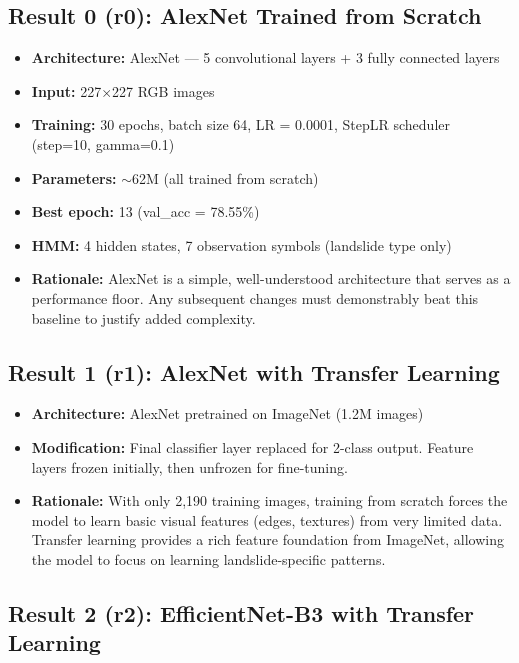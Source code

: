 \documentclass[11pt]{article}
\begin{document}
\subsection{Result 0 (r0): AlexNet Trained from Scratch}

\begin{itemize}[noitemsep]
    \item \textbf{Architecture:} AlexNet --- 5 convolutional layers + 3 fully connected layers
    \item \textbf{Input:} 227$\times$227 RGB images
    \item \textbf{Training:} 30 epochs, batch size 64, LR = 0.0001, StepLR scheduler (step=10, gamma=0.1)
    \item \textbf{Parameters:} $\sim$62M (all trained from scratch)
    \item \textbf{Best epoch:} 13 (val\_acc = 78.55\%)
    \item \textbf{HMM:} 4 hidden states, 7 observation symbols (landslide type only)
    \item \textbf{Rationale:} AlexNet is a simple, well-understood architecture that serves as a performance floor. Any subsequent changes must demonstrably beat this baseline to justify added complexity.
\end{itemize}

\subsection{Result 1 (r1): AlexNet with Transfer Learning}

\begin{itemize}[noitemsep]
    \item \textbf{Architecture:} AlexNet pretrained on ImageNet (1.2M images)
    \item \textbf{Modification:} Final classifier layer replaced for 2-class output. Feature layers frozen initially, then unfrozen for fine-tuning.
    \item \textbf{Rationale:} With only 2,190 training images, training from scratch forces the model to learn basic visual features (edges, textures) from very limited data. Transfer learning provides a rich feature foundation from ImageNet, allowing the model to focus on learning landslide-specific patterns.
\end{itemize}

\subsection{Result 2 (r2): EfficientNet-B3 with Transfer Learning}
\end{document}
